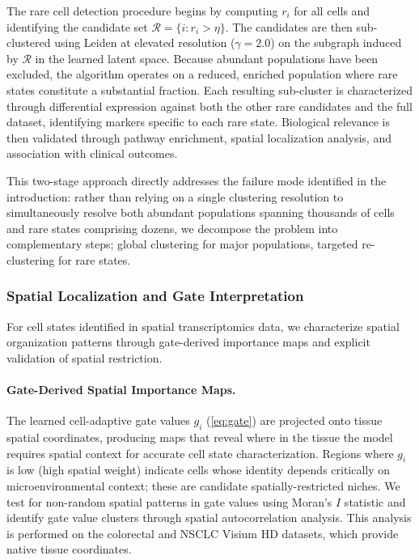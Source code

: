 \documentclass{article}
\begin{document}
The rare cell detection procedure begins by computing $r_i$ for all cells and identifying the candidate set $\mathcal{R} = \{i : r_i > \eta\}$. The candidates are then sub-clustered using Leiden at elevated resolution ($\gamma = 2.0$) on the subgraph induced by $\mathcal{R}$ in the learned latent space. Because abundant populations have been excluded, the algorithm operates on a reduced, enriched population where rare states constitute a substantial fraction. Each resulting sub-cluster is characterized through differential expression against both the other rare candidates and the full dataset, identifying markers specific to each rare state. Biological relevance is then validated through pathway enrichment, spatial localization analysis, and association with clinical outcomes.

This two-stage approach directly addresses the failure mode identified in the introduction: rather than relying on a single clustering resolution to simultaneously resolve both abundant populations spanning thousands of cells and rare states comprising dozens, we decompose the problem into complementary steps; global clustering for major populations, targeted re-clustering for rare states.


\subsubsection{Spatial Localization and Gate Interpretation}

For cell states identified in spatial transcriptomics data, we characterize spatial organization patterns through gate-derived importance maps and explicit validation of spatial restriction.

\paragraph{Gate-Derived Spatial Importance Maps.} The learned cell-adaptive gate values $g_i$ (\cref{eq:gate}) are projected onto tissue spatial coordinates, producing maps that reveal where in the tissue the model requires spatial context for accurate cell state characterization. Regions where $g_i$ is low (high spatial weight) indicate cells whose identity depends critically on microenvironmental context; these are candidate spatially-restricted niches. We test for non-random spatial patterns in gate values using Moran's $I$ statistic and identify gate value clusters through spatial autocorrelation analysis. This analysis is performed on the colorectal and NSCLC Visium HD datasets, which provide native tissue coordinates.
\end{document}
